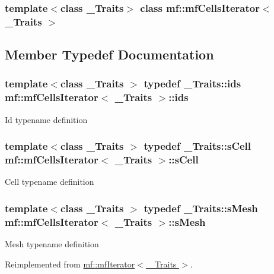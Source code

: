 \subsubsection*{template$<$class \_\-Traits$>$ class mf::mfCellsIterator$<$ \_\-Traits $>$}



\subsection{Member Typedef Documentation}
\hypertarget{classmf_1_1mfCellsIterator_a836ea7a8c64a86f414d71c2556969e1c}{
\subsubsection[{ids}]{\setlength{\rightskip}{0pt plus 5cm}template$<$class \_\-Traits $>$ typedef \_\-Traits::ids {\bf mf::mfCellsIterator}$<$ \_\-Traits $>$::{\bf ids}}}
\label{classmf_1_1mfCellsIterator_a836ea7a8c64a86f414d71c2556969e1c}
Id typename definition \hypertarget{classmf_1_1mfCellsIterator_afe3e76ed6519e2ad74dff562b23aa52f}{
\subsubsection[{sCell}]{\setlength{\rightskip}{0pt plus 5cm}template$<$class \_\-Traits $>$ typedef \_\-Traits::sCell {\bf mf::mfCellsIterator}$<$ \_\-Traits $>$::{\bf sCell}}}
\label{classmf_1_1mfCellsIterator_afe3e76ed6519e2ad74dff562b23aa52f}
Cell typename definition \hypertarget{classmf_1_1mfCellsIterator_a3f16876b669a93e719af84cdc0c9dad9}{
\subsubsection[{sMesh}]{\setlength{\rightskip}{0pt plus 5cm}template$<$class \_\-Traits $>$ typedef \_\-Traits::sMesh {\bf mf::mfCellsIterator}$<$ \_\-Traits $>$::{\bf sMesh}}}
\label{classmf_1_1mfCellsIterator_a3f16876b669a93e719af84cdc0c9dad9}
Mesh typename definition 

Reimplemented from \hyperlink{classmf_1_1mfIterator_aca31e4d7e7eca4e3b100530d8725064b}{mf::mfIterator$<$ \_\-Traits $>$}.



